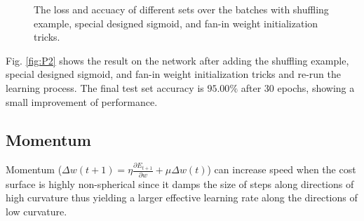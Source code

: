 \documentclass{article} %
\begin{document}
\begin{figure} [!htbp]
	
	\caption{The loss and accuacy of different sets over the batches with shuffling example, special designed sigmoid, and fan-in weight initialization tricks. }  
	\label{fig:P4}
\end{figure}

Fig. \ref{fig:P2} shows the result on the network after adding the shuffling example, special designed sigmoid, and fan-in weight initialization tricks and re-run the learning process. The final test set accuracy is $95.00\%$ after 30 epochs, showing a small improvement of performance.

\subsection{Momentum}
Momentum ($\Delta w(t+1) = \eta\frac{\partial E_{t+1}}{\partial w} + \mu \Delta w(t)$) can increase speed when the cost surface is highly non-spherical since it damps the size of steps along directions of high curvature thus yielding a larger effective learning rate along the directions of low curvature. 
\end{document}
